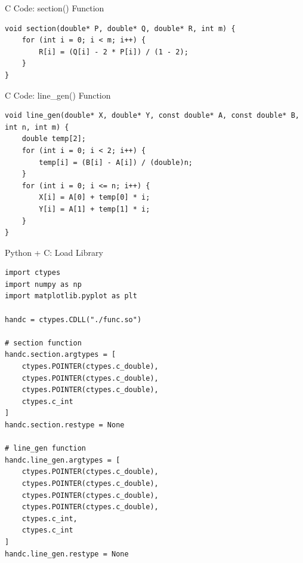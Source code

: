 \documentclass{beamer}
\begin{document}
\begin{frame}[fragile]{C Code: section() Function}
\begin{lstlisting}[style=CStyle]
void section(double* P, double* Q, double* R, int m) {
    for (int i = 0; i < m; i++) {
        R[i] = (Q[i] - 2 * P[i]) / (1 - 2);
    }
}
\end{lstlisting}
\end{frame}

\begin{frame}[fragile]{C Code: line\_gen() Function}
\begin{lstlisting}[style=CStyle]
void line_gen(double* X, double* Y, const double* A, const double* B, int n, int m) {
    double temp[2];
    for (int i = 0; i < 2; i++) {
        temp[i] = (B[i] - A[i]) / (double)n;
    }
    for (int i = 0; i <= n; i++) {
        X[i] = A[0] + temp[0] * i;
        Y[i] = A[1] + temp[1] * i;
    }
}
\end{lstlisting}
\end{frame}

\begin{frame}[fragile]{Python + C: Load Library}
\begin{lstlisting}[style=PyStyle]
import ctypes
import numpy as np
import matplotlib.pyplot as plt

handc = ctypes.CDLL("./func.so")

# section function
handc.section.argtypes = [
    ctypes.POINTER(ctypes.c_double),
    ctypes.POINTER(ctypes.c_double),
    ctypes.POINTER(ctypes.c_double),
    ctypes.c_int
]
handc.section.restype = None

# line_gen function
handc.line_gen.argtypes = [
    ctypes.POINTER(ctypes.c_double),
    ctypes.POINTER(ctypes.c_double),
    ctypes.POINTER(ctypes.c_double),
    ctypes.POINTER(ctypes.c_double),
    ctypes.c_int,
    ctypes.c_int
]
handc.line_gen.restype = None
\end{lstlisting}
\end{frame}
\end{document}
